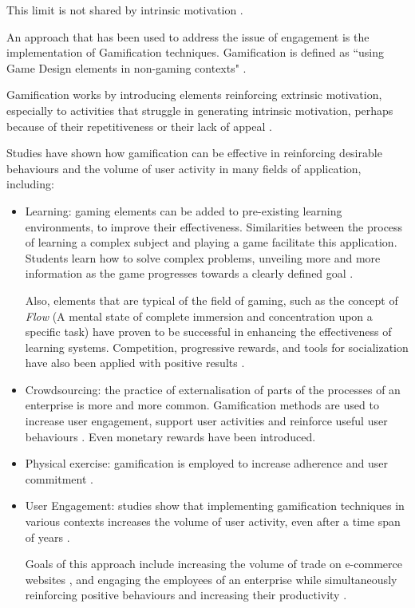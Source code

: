\documentclass[12pt,a4paper,oneside]{report}
\begin{document}
This limit is not shared by intrinsic motivation \cite{ryan2000}.

\bigskip

An approach that has been used to address the issue of engagement is the implementation of Gamification techniques. Gamification is defined as ``using Game Design elements in non-gaming contexts" \cite{deterdinggamification}. 

Gamification works by introducing elements reinforcing extrinsic motivation, especially to activities that struggle in generating intrinsic motivation, perhaps because of their repetitiveness or their lack of appeal \cite{seaborn2015gamification}.


Studies have shown how gamification can be effective in reinforcing desirable behaviours and the volume of user activity \cite{hamari14} in many fields of application, including:

\begin{itemize}\setlength{\itemsep}{8pt}
\item Learning: gaming elements can be added to pre-existing learning environments, to improve their effectiveness. Similarities between the process of learning a complex subject and playing a game facilitate this application. Students learn how to solve complex problems, unveiling more and more information as the game progresses towards a clearly defined goal \cite{gamificationlearning}.

Also, elements that are typical of the field of gaming, such as the concept of \textit{Flow} (A mental state of complete immersion and concentration upon a specific task) have proven to be successful in enhancing the effectiveness of learning systems\cite{gamificationlearning}. Competition, progressive rewards, and tools for socialization have also been applied with positive results \cite{gamificationlearning2}.

\item Crowdsourcing: the practice of externalisation of parts of the processes of an enterprise is more and more common. Gamification methods are used to increase user engagement, support user activities and reinforce useful user behaviours \cite{gamificationcrowdsourcing}. Even monetary rewards have been introduced.

\item Physical exercise: gamification is employed to increase adherence and user commitment  \cite{gamificationexercise}.

\item User Engagement: studies show that implementing gamification techniques in various contexts increases the volume of user activity, even after a time span of years \cite{gamificationengagement1}.

Goals of this approach include increasing the volume of trade on e-commerce websites \cite{gamificationecommerce}, and engaging the employees of an enterprise while simultaneously reinforcing positive behaviours and increasing their productivity \cite{gamificationenterprise}.
\end{itemize}
\end{document}
